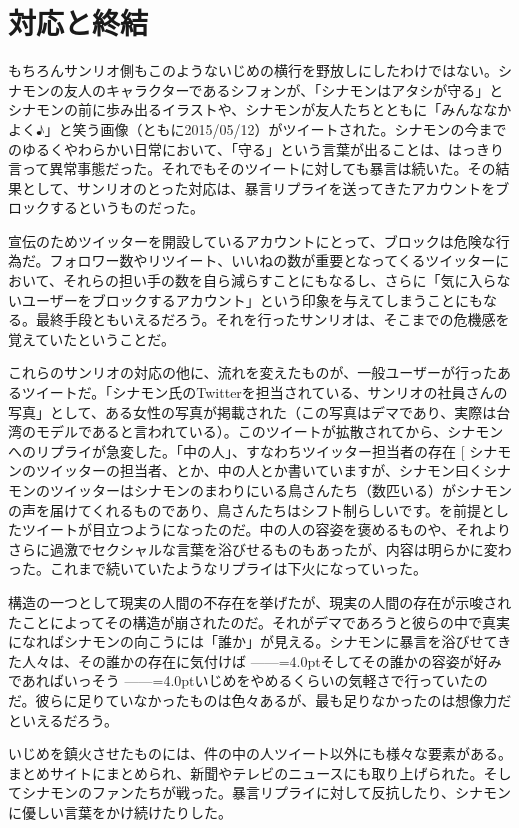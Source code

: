 \documentclass[b5j,twoside,twocolumn]{utarticle}
\makeatletter
\def\yakuchu{%
\@ifnextchar[\@xfootnote %
{\stepcounter{yakuchu}%
\protected@xdef\@thefnmark{\theyakuchu}%
\@footnotemark\@footnotetext}}
\makeatother
\begin{document}
\section*{対応と終結}
もちろんサンリオ側もこのようないじめの横行を野放しにしたわけではない。シナモンの友人のキャラクターであるシフォンが、「シナモンはアタシが守る」とシナモンの前に歩み出るイラストや、シナモンが友人たちとともに「みんななかよく♪」と笑う画像（ともに2015/05/12）がツイートされた。シナモンの今までのゆるくやわらかい日常において、「守る」という言葉が出ることは、はっきり言って異常事態だった。それでもそのツイートに対しても暴言は続いた。その結果として、サンリオのとった対応は、暴言リプライを送ってきたアカウントをブロックするというものだった。


宣伝のためツイッターを開設しているアカウントにとって、ブロックは危険な行為だ。フォロワー数やリツイート、いいねの数が重要となってくるツイッターにおいて、それらの担い手の数を自ら減らすことにもなるし、さらに「気に入らないユーザーをブロックするアカウント」という印象を与えてしまうことにもなる。最終手段ともいえるだろう。それを行ったサンリオは、そこまでの危機感を覚えていたということだ。


これらのサンリオの対応の他に、流れを変えたものが、一般ユーザーが行ったあるツイートだ。「シナモン氏のTwitterを担当されている、サンリオの社員さんの写真」として、ある女性の写真が掲載された（この写真はデマであり、実際は台湾のモデルであると言われている）。このツイートが拡散されてから、シナモンへのリプライが急変した。「中の人」、すなわちツイッター担当者の存在\yakuchu{シナモンのツイッターの担当者、とか、中の人とか書いていますが、シナモン曰くシナモンのツイッターはシナモンのまわりにいる鳥さんたち（数匹いる）がシナモンの声を届けてくれるものであり、鳥さんたちはシフト制らしいです。}を前提としたツイートが目立つようになったのだ。中の人の容姿を褒めるものや、それよりさらに過激でセクシャルな言葉を浴びせるものもあったが、内容は明らかに変わった。これまで続いていたようなリプライは下火になっていった。


構造の一つとして現実の人間の不存在を挙げたが、現実の人間の存在が示唆されたことによってその構造が崩されたのだ。それがデマであろうと彼らの中で真実になればシナモンの向こうには「誰か」が見える。シナモンに暴言を浴びせてきた人々は、その誰かの存在に気付けば\tbaselineshift =2.5pt ------\tbaselineshift =4.0ptそしてその誰かの容姿が好みであればいっそう\tbaselineshift =2.5pt ------\tbaselineshift =4.0ptいじめをやめるくらいの気軽さで行っていたのだ。彼らに足りていなかったものは色々あるが、最も足りなかったのは想像力だといえるだろう。


いじめを鎮火させたものには、件の中の人ツイート以外にも様々な要素がある。まとめサイトにまとめられ、新聞やテレビのニュースにも取り上げられた。そしてシナモンのファンたちが戦った。暴言リプライに対して反抗したり、シナモンに優しい言葉をかけ続けたりした。
\end{document}
